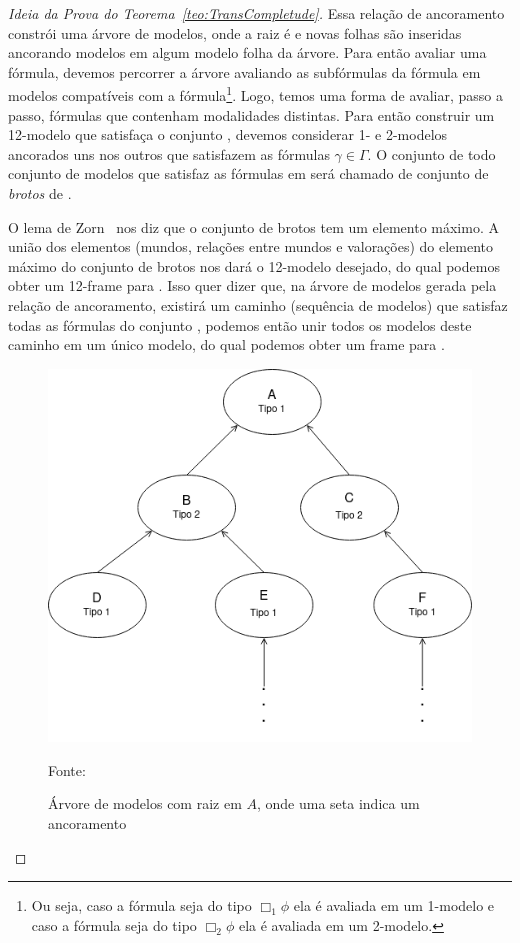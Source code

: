 \begin{proof}[Ideia da Prova do Teorema~\ref{teo:TransCompletude}]
                Essa relação de ancoramento constrói uma árvore de modelos, onde a raiz é \Modeloinicial e novas folhas são inseridas ancorando modelos em algum modelo folha
                da árvore. Para então avaliar uma fórmula, devemos percorrer a árvore avaliando as subfórmulas da fórmula em modelos compatíveis com a fórmula\footnote{Ou seja, caso
                a fórmula seja do tipo \(\Box_{1}\phi\) ela é avaliada em um 1-modelo e caso a fórmula seja do tipo \(\Box_{2}\phi\) ela é avaliada em um 2-modelo.}.
                Logo, temos uma forma de avaliar, passo a passo, fórmulas que contenham modalidades distintas. Para então construir um 12-modelo que satisfaça o conjunto \GAMMA,
                devemos considerar 1- e 2-modelos ancorados uns nos outros que satisfazem as fórmulas \(\gamma \in \Gamma\). O conjunto de todo conjunto de modelos
                que satisfaz as fórmulas em \GAMMA será chamado de conjunto de \textit{brotos} de \Modeloinicial.

                O lema de Zorn~\cite{zorn1935remark} nos diz que o conjunto de brotos tem um elemento máximo. A união dos elementos (mundos, relações entre mundos e valorações) do elemento
                máximo do conjunto de brotos nos dará o 12-modelo desejado, do qual podemos obter um 12-frame para . Isso quer dizer que, na árvore de modelos gerada
                pela relação de ancoramento, existirá um caminho (sequência de modelos) que satisfaz todas as fórmulas do conjunto \GAMMA, podemos então unir todos os modelos deste caminho
                em um único modelo, do qual podemos obter um frame para .

                \begin{figure}[htbp]
                    \centering
                    \includegraphics[scale=.5]{Figuras/ArvoreModelos.png}
                    \caption[Árvore de modelos]{Árvore de modelos com raiz em \(A\), onde uma seta indica um ancoramento}
                    \small{Fonte: \me}
                    \label{fig:ArvoreModelos}
                \end{figure}


\end{proof}
